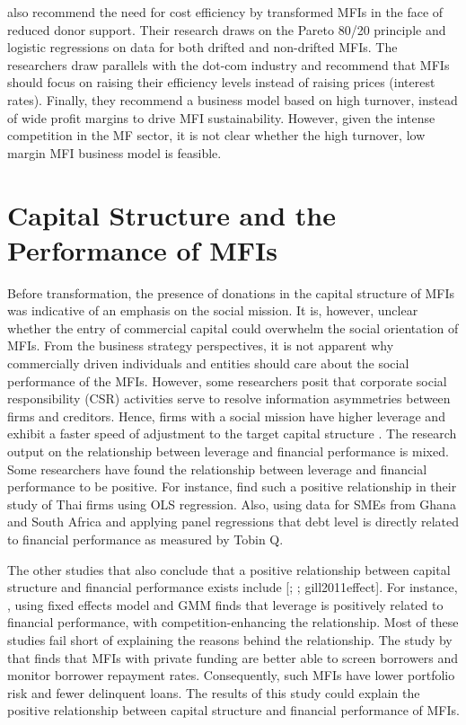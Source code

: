 \documentclass[a4paper, nobind]{templates/ociamthesis}
\begin{document}
\textcite{serrano2014microfinance} also recommend the need for cost efficiency by transformed MFIs in the face of reduced donor support. Their research draws on the Pareto 80/20 principle and logistic regressions on data for both drifted and non-drifted MFIs. The researchers draw parallels with the dot-com industry and recommend that MFIs should focus on raising their efficiency levels instead of raising prices (interest rates). Finally, they recommend a business model based on high turnover, instead of wide profit margins to drive MFI sustainability. However, given the intense competition in the MF sector, it is not clear whether the high turnover, low margin MFI business model is feasible.

\hypertarget{capital-structure-and-the-performance-of-mfis}{%
\section{Capital Structure and the Performance of MFIs}\label{capital-structure-and-the-performance-of-mfis}}

\noindent Before transformation, the presence of donations in the capital structure of MFIs was indicative of an emphasis on the social mission. It is, however, unclear whether the entry of commercial capital could overwhelm the social orientation of MFIs. From the business strategy perspectives, it is not apparent why commercially driven individuals and entities should care about the social performance of the MFIs. However, some researchers posit that corporate social responsibility (CSR) activities serve to resolve information asymmetries between firms and creditors. Hence, firms with a social mission have higher leverage and exhibit a faster speed of adjustment to the target capital structure \autocite{yang2018does}.
The research output on the relationship between leverage and financial performance is mixed. Some researchers have found the relationship between leverage and financial performance to be positive. For instance,\textcite{detthamrong2017corporate} find such a positive relationship in their study of Thai firms using OLS regression. Also, \textcite{abor2007debt} using data for SMEs from Ghana and South Africa and applying panel regressions that debt level is directly related to financial performance as measured by Tobin Q.

The other studies that also conclude that a positive relationship between capital structure and financial performance exists include {[}\textcite{abor2005effect}; \textcite{berger2006capital}; gill2011effect{]}. For instance, \textcite{fosu2013capital}, using fixed effects model and GMM finds that leverage is positively related to financial performance, with competition-enhancing the relationship. Most of these studies fail short of explaining the reasons behind the relationship. The study by \textcite{chakravarty2015role} that finds that MFIs with private funding are better able to screen borrowers and monitor borrower repayment rates. Consequently, such MFIs have lower portfolio risk and fewer delinquent loans. The results of this study could explain the positive relationship between capital structure and financial performance of MFIs.
\end{document}
